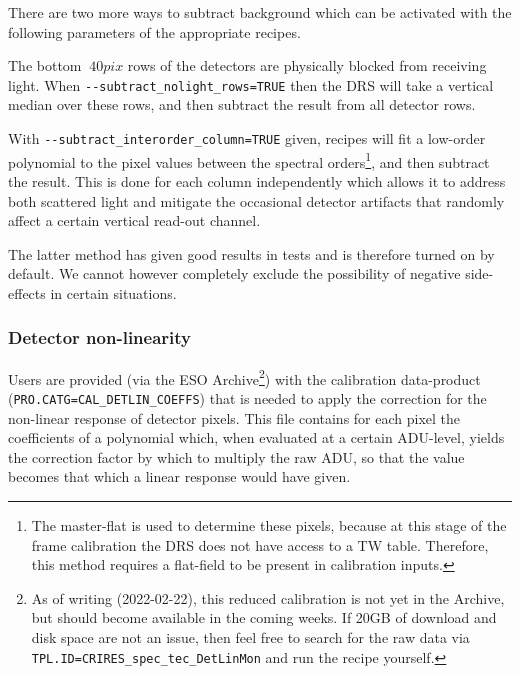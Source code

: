 There are two more ways to subtract background which can be activated with the
following parameters of the appropriate recipes.

The bottom $~40pix$ rows of the detectors are physically blocked from receiving
light. When \linebreak\verb!--subtract_nolight_rows=TRUE! then the DRS will take
a vertical median over these rows, and then subtract the result from all
detector rows.

With \verb!--subtract_interorder_column=TRUE! given, recipes will fit a
low-order polynomial to the pixel values between the spectral
orders\footnote{The master-flat is used to determine these pixels, because at
this stage of the frame calibration the DRS does not have access to a TW table.
Therefore, this method requires a flat-field to be present in calibration
inputs.}, and then subtract the result. This is done for each column
independently which allows it to address both scattered light and mitigate the
occasional detector artifacts that randomly affect a certain vertical read-out
channel.

The latter method has given good results in tests and is therefore turned on by
default. We cannot however completely exclude the possibility of negative
side-effects in certain situations.

\subsubsection{Detector non-linearity}
\label{sec:detlin}



Users are provided (via the ESO Archive\footnote{As of writing (2022-02-22),
this reduced calibration is not yet in the Archive, but should become available
in the coming weeks. If 20GB of download and disk space are not an issue, then
feel free to search for the raw data via
\texttt{TPL.ID=CRIRES\_spec\_tec\_DetLinMon} and run the recipe yourself.}) with the
calibration data-product (\verb!PRO.CATG=CAL_DETLIN_COEFFS!) that is needed to
apply the correction for the non-linear response of detector pixels. This file
contains for each pixel the coefficients of a polynomial which, when evaluated
at a certain ADU-level, yields the correction factor by which to multiply the
raw ADU, so that the value becomes that which a linear response would have
given.

